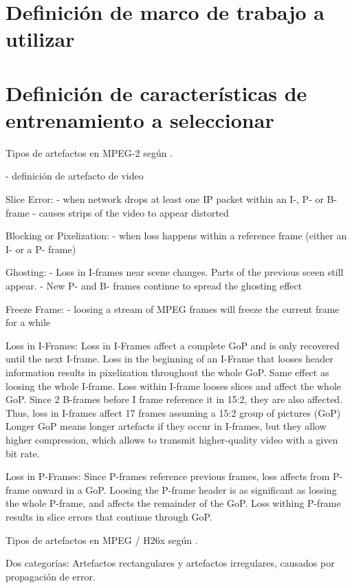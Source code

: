 \section{Definición de marco de trabajo a utilizar}

\section{Definición de características de entrenamiento a seleccionar}

Tipos de artefactos en MPEG-2 según \cite{Greengrass2009}.

- definición de artefacto de video

Slice Error:
- when network drops at least one IP packet within an I-, P- or B- frame
- causes strips of the video to appear distorted

Blocking or Pixelization:
- when loss happens within a reference frame (either an I- or a P- frame)

Ghosting:
- Loss in I-frames near scene changes. Parts of the previous sceen still appear.
- New P- and B- frames continue to spread the ghosting effect

Freeze Frame:
- loosing a stream of MPEG frames will freeze the current frame for a while

Loss in I-Frames:
Loss in I-Frames affect a complete GoP and is only recovered until the next I-frame.
Loss in the beginning of an I-Frame that looses header information results in pixelization throughout the whole GoP. Same effect as loosing the whole I-frame.
Loss within I-frame looses slices and affect the whole GoP.
Since 2 B-frames before I frame reference it in 15:2, they are also affected.
Thus, loss in I-frames affect 17 frames assuming a 15:2 group of pictures (GoP)
Longer GoP means longer artefacts if they occur in I-frames, but they allow
higher compression, which allows to transmit higher-quality video with a given
bit rate.

Loss in P-Frames:
Since P-frames reference previous frames, loss affects from P-frame onward in a GoP.
Loosing the P-frame header is as significant as lossing the whole P-frame, and affects the remainder of the GoP.
Loss withing P-frame results in slice errors that continue through GoP.

Tipos de artefactos en MPEG / H26x según \cite{Glavota2016}.

Dos categorías: Artefactos rectangulares y artefactos irregulares, causados por propagación de error.

